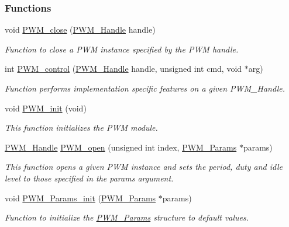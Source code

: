 \subsubsection*{Functions}
\begin{DoxyCompactItemize}
\item 
void \hyperlink{_p_w_m_8h_a0e0f5899b067d27653db566fb148db11}{P\+W\+M\+\_\+close} (\hyperlink{_p_w_m_8h_afdefc765f42bbad4dca246fda6e1354b}{P\+W\+M\+\_\+\+Handle} handle)
\begin{DoxyCompactList}\small\item\em Function to close a P\+W\+M instance specified by the P\+W\+M handle. \end{DoxyCompactList}\item 
int \hyperlink{_p_w_m_8h_ade999f5b12997479efa1ac85aaf46ef5}{P\+W\+M\+\_\+control} (\hyperlink{_p_w_m_8h_afdefc765f42bbad4dca246fda6e1354b}{P\+W\+M\+\_\+\+Handle} handle, unsigned int cmd, void $\ast$arg)
\begin{DoxyCompactList}\small\item\em Function performs implementation specific features on a given P\+W\+M\+\_\+\+Handle. \end{DoxyCompactList}\item 
void \hyperlink{_p_w_m_8h_aadae3fe77e36cbf9643a22eeb99fb01e}{P\+W\+M\+\_\+init} (void)
\begin{DoxyCompactList}\small\item\em This function initializes the P\+W\+M module. \end{DoxyCompactList}\item 
\hyperlink{_p_w_m_8h_afdefc765f42bbad4dca246fda6e1354b}{P\+W\+M\+\_\+\+Handle} \hyperlink{_p_w_m_8h_ac963beab0c5c6901bf852f175028aeaf}{P\+W\+M\+\_\+open} (unsigned int index, \hyperlink{struct_p_w_m___params}{P\+W\+M\+\_\+\+Params} $\ast$params)
\begin{DoxyCompactList}\small\item\em This function opens a given P\+W\+M instance and sets the period, duty and idle level to those specified in the params argument. \end{DoxyCompactList}\item 
void \hyperlink{_p_w_m_8h_acbdd3192f9f06bf689e4a3855926dcac}{P\+W\+M\+\_\+\+Params\+\_\+init} (\hyperlink{struct_p_w_m___params}{P\+W\+M\+\_\+\+Params} $\ast$params)
\begin{DoxyCompactList}\small\item\em Function to initialize the \hyperlink{struct_p_w_m___params}{P\+W\+M\+\_\+\+Params} structure to default values. \end{DoxyCompactList}\item 

\end{DoxyCompactItemize}
